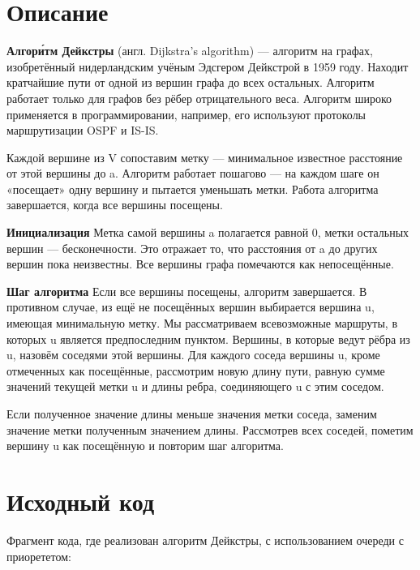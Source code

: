 \section{Описание}

\textbf{Алгори́тм Дейкстры} (англ. Dijkstra’s algorithm) — алгоритм на графах, изобретённый нидерландским учёным Эдсгером Дейкстрой в 1959 году. Находит кратчайшие пути от одной из вершин графа до всех остальных. Алгоритм работает только для графов без рёбер отрицательного веса. Алгоритм широко применяется в программировании, например, его используют протоколы маршрутизации OSPF и IS-IS.\newline

Каждой вершине из V сопоставим метку — минимальное известное расстояние от этой вершины до a. Алгоритм работает пошагово — на каждом шаге он «посещает» одну вершину и пытается уменьшать метки. Работа алгоритма завершается, когда все вершины посещены.\newline

\textbf{Инициализация}\newline
Метка самой вершины a полагается равной 0, метки остальных вершин — бесконечности. Это отражает то, что расстояния от a до других вершин пока неизвестны. Все вершины графа помечаются как непосещённые.\newline

\textbf{Шаг алгоритма}\newline
Если все вершины посещены, алгоритм завершается. В противном случае, из ещё не посещённых вершин выбирается вершина u, имеющая минимальную метку. Мы рассматриваем всевозможные маршруты, в которых u является предпоследним пунктом. Вершины, в которые ведут рёбра из u, назовём соседями этой вершины. Для каждого соседа вершины u, кроме отмеченных как посещённые, рассмотрим новую длину пути, равную сумме значений текущей метки u и длины ребра, соединяющего u с этим соседом.\newline

Если полученное значение длины меньше значения метки соседа, заменим значение метки полученным значением длины. Рассмотрев всех соседей, пометим вершину u как посещённую и повторим шаг алгоритма.\newline
\pagebreak

\section{Исходный код}
Фрагмент кода, где реализован алгоритм Дейкстры, с использованием очереди с приорететом:\newline


